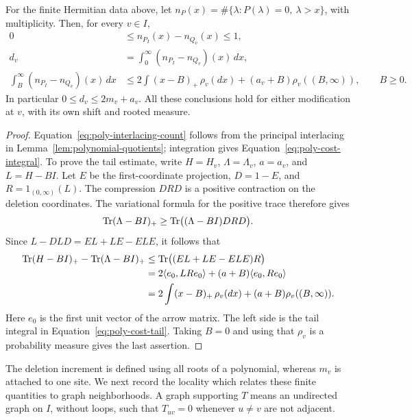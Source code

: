 \begin{lemma}\label{lem:positive-cost}
For the finite Hermitian data above, let
\(n_P(x)=\#\{\lambda:P(\lambda)=0,\ \lambda>x\}\), with multiplicity.
Then, for every \(v\in I\),
\begin{align}
 0&\leq n_{P_I}(x)-n_{Q_v}(x)\leq1, \label{eq:poly-interlacing-count}\\
 d_v&=\int_0^\infty(n_{P_I}-n_{Q_v})(x)\,dx, \label{eq:poly-cost-integral}\\
 \int_B^\infty(n_{P_I}-n_{Q_v})(x)\,dx
 &\leq 2\int(x-B)_+\,\rho_v(dx)
              +(a_v+B)\rho_v((B,\infty)),\qquad B\geq0.
 \label{eq:poly-cost-tail}
\end{align}
In particular \(0\leq d_v\leq2m_v+a_v\).
All these conclusions hold for either modification at \(v\), with its
own shift and rooted measure.
\end{lemma}

\begin{proof}
Equation~\eqref{eq:poly-interlacing-count} follows from the principal
interlacing in Lemma~\ref{lem:polynomial-quotients}; integration gives
Equation~\eqref{eq:poly-cost-integral}.  To prove the tail estimate,
write \(H=H_v\), \(\Lambda=\Lambda_v\), \(a=a_v\), and
\(L=H-BI\).  Let \(E\) be the first-coordinate projection,
\(D=1-E\), and \(R=1_{(0,\infty)}(L)\).
The compression \(DRD\) is a positive contraction on the deletion
coordinates.  The variational formula for the positive trace therefore
gives
\[
 \operatorname{Tr}(\Lambda-BI)_+\geq\operatorname{Tr}\bigl((\Lambda-BI)DRD\bigr).
\]
Since \(L-DLD=EL+LE-ELE\), it follows that
\begin{align*}
 \operatorname{Tr}(H-BI)_+-\operatorname{Tr}(\Lambda-BI)_+
 &\leq\operatorname{Tr}\bigl((EL+LE-ELE)R\bigr)\\
 &=2\langle e_0,LR e_0\rangle+(a+B)\langle e_0,R e_0\rangle\\
 &=2\int(x-B)_+\,\rho_v(dx)+(a+B)\rho_v((B,\infty)).
\end{align*}
Here \(e_0\) is the first unit vector of the arrow matrix.
The left side is the tail integral in
Equation~\eqref{eq:poly-cost-tail}.  Taking \(B=0\) and using that
\(\rho_v\) is a probability measure gives the last assertion.
\end{proof}

The deletion increment is defined using all roots of a polynomial,
whereas \(m_v\) is attached to one site.  We next record the locality
which relates these finite quantities to graph neighborhoods.  A graph
supporting \(T\) means an undirected graph on \(I\), without loops,
such that \(T_{uv}=0\) whenever \(u\ne v\) are not adjacent.


